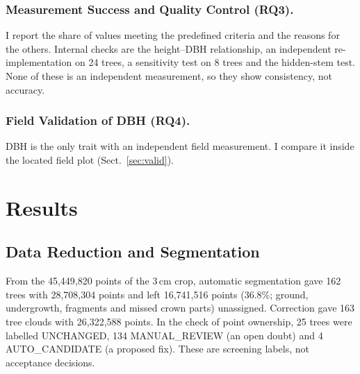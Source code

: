 \documentclass[runningheads]{llncs}
\begin{document}
\subsubsection{Measurement Success and Quality Control (RQ3).}
I report the share of values meeting the predefined criteria and the reasons for the others. Internal checks are the height--DBH relationship, an independent re-implementation on 24 trees, a sensitivity test on 8 trees and the hidden-stem test. None of these is an independent measurement, so they show consistency, not accuracy.

\subsubsection{Field Validation of DBH (RQ4).}
DBH is the only trait with an independent field measurement. I compare it inside the located field plot (Sect.~\ref{sec:valid}).

\section{Results}\label{sec:results}

\subsection{Data Reduction and Segmentation}\label{sec:res-seg}
From the 45,449,820 points of the 3\,cm crop, automatic segmentation gave 162 trees with 28,708,304 points and left 16,741,516 points (36.8\%; ground, undergrowth, fragments and missed crown parts) unassigned. Correction gave 163 tree clouds with 26,322,588 points. In the check of point ownership, 25 trees were labelled UNCHANGED, 134 MANUAL\_REVIEW (an open doubt) and 4 AUTO\_CANDIDATE (a proposed fix). These are screening labels, not acceptance decisions.
\end{document}
